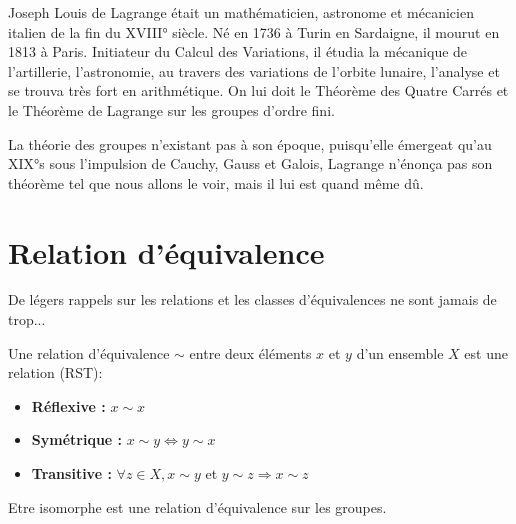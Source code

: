 
\minitoc  %

Joseph Louis de Lagrange était un mathématicien, astronome et mécanicien italien de la fin du XVIII° siècle. 
Né en 1736 à Turin en Sardaigne, il mourut en 1813 à Paris. Initiateur du Calcul des Variations, il étudia la mécanique de l'artillerie, 
l'astronomie, au travers des variations de l'orbite lunaire, l'analyse et se trouva très fort en arithmétique. 
On lui doit le Théorème des Quatre Carrés et le Théorème de Lagrange sur les groupes d'ordre fini. 

La théorie des groupes n'existant pas à son époque, puisqu'elle émergeat qu'au XIX°s sous l'impulsion de Cauchy, Gauss et Galois,
Lagrange n'énonça pas son théorème tel que nous allons le voir, mais il lui est quand même dû.


\section{Relation d'équivalence}

De légers rappels sur les relations et les classes d'équivalences ne sont jamais de trop... 

\begin{definition}
    Une relation d'équivalence $\sim$ entre deux éléments $x$ et $y$ d'un ensemble $X$ est une relation (RST):
    \begin{itemize}
        \item \textbf{Réflexive : } $x \sim x$ 
        \item \textbf{Symétrique :} $x \sim y \Longleftrightarrow y \sim x$ 
        \item \textbf{Transitive : } $ \forall z \in X, x \sim y $ et $y \sim z \Longrightarrow x \sim z $
    \end{itemize}
\end{definition}

\begin{remark}
    Etre isomorphe est une relation d'équivalence sur les groupes. 
\end{remark}

